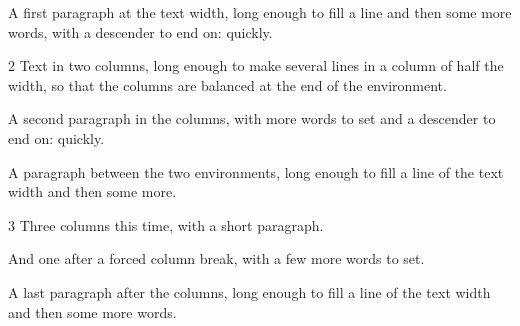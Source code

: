 \documentclass[11pt]{article}
\begin{document}
A first paragraph at the text width, long enough to fill a line and then some
more words, with a descender to end on: quickly.

\begin{multicols}{2}
Text in two columns, long enough to make several lines in a column of half the
width, so that the columns are balanced at the end of the environment.

A second paragraph in the columns, with more words to set and a descender to
end on: quickly.
\end{multicols}

A paragraph between the two environments, long enough to fill a line of the
text width and then some more.

\begin{multicols}{3}
Three columns this time, with a short paragraph.
\columnbreak

And one after a forced column break, with a few more words to set.
\end{multicols}

A last paragraph after the columns, long enough to fill a line of the text
width and then some more words.
\end{document}
